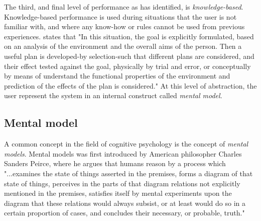 The third, and final level of performance as \cite{Rasmussen1983} has identified, is \textit{knowledge-based}. Knowledge-based performance is used during situations that the user is not familiar with, and where any know-how or rules cannot be used from previous experiences. \cite{Rasmussen1983} states that "In this situation, the goal is explicitly formulated, based on an analysis of the environment and the overall aims of the person. Then a useful plan is developed-by selection-such that different plans are considered, and their effect tested against the goal, physically by trial and error, or conceptually by means of understand the functional properties of the environment and prediction of the effects of the plan is considered." At this level of abstraction, the user represent the system in an internal construct called \textit{mental model}.


\subsection{Mental model}
A common concept in the field of cognitive psychology is the concept of \textit{mental models}. Mental models was first introduced by American philosopher Charles Sanders Peirce, where he argues that humans reason by a process which
"...examines the state of things
asserted in the premises, forms a diagram of that state of things, perceives in the parts of that diagram relations not explicitly mentioned in the premises, satisfies itself by mental experiments upon the diagram that these relations would always subsist, or at least would do so in a certain proportion of cases, and concludes their necessary, or probable, truth." \cite{Pierce1974}

